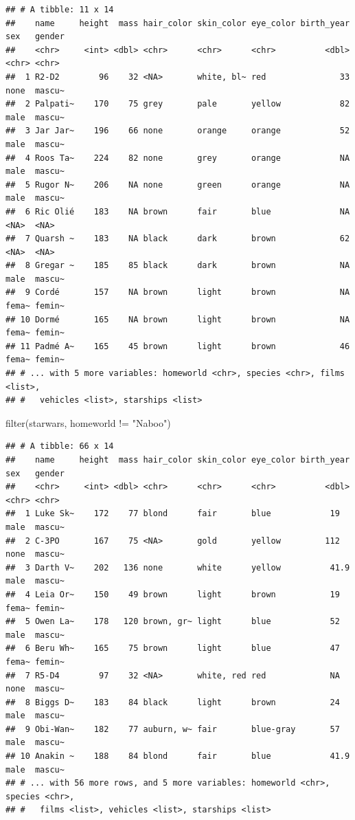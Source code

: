 \documentclass[]{tufte-handout}
\newenvironment{Shaded}{}{}
\newcommand{\FunctionTok}[1]{\textcolor[rgb]{0.02,0.16,0.49}{#1}}
\newcommand{\NormalTok}[1]{#1}
\newcommand{\SpecialCharTok}[1]{\textcolor[rgb]{0.25,0.44,0.63}{#1}}
\newcommand{\StringTok}[1]{\textcolor[rgb]{0.25,0.44,0.63}{#1}}
\begin{document}
\begin{verbatim}
## # A tibble: 11 x 14
##    name     height  mass hair_color skin_color eye_color birth_year sex   gender
##    <chr>     <int> <dbl> <chr>      <chr>      <chr>          <dbl> <chr> <chr> 
##  1 R2-D2        96    32 <NA>       white, bl~ red               33 none  mascu~
##  2 Palpati~    170    75 grey       pale       yellow            82 male  mascu~
##  3 Jar Jar~    196    66 none       orange     orange            52 male  mascu~
##  4 Roos Ta~    224    82 none       grey       orange            NA male  mascu~
##  5 Rugor N~    206    NA none       green      orange            NA male  mascu~
##  6 Ric Olié    183    NA brown      fair       blue              NA <NA>  <NA>  
##  7 Quarsh ~    183    NA black      dark       brown             62 <NA>  <NA>  
##  8 Gregar ~    185    85 black      dark       brown             NA male  mascu~
##  9 Cordé       157    NA brown      light      brown             NA fema~ femin~
## 10 Dormé       165    NA brown      light      brown             NA fema~ femin~
## 11 Padmé A~    165    45 brown      light      brown             46 fema~ femin~
## # ... with 5 more variables: homeworld <chr>, species <chr>, films <list>,
## #   vehicles <list>, starships <list>
\end{verbatim}

\begin{Shaded}
\begin{Highlighting}[]
\FunctionTok{filter}\NormalTok{(starwars, homeworld }\SpecialCharTok{!=} \StringTok{"Naboo"}\NormalTok{)}
\end{Highlighting}
\end{Shaded}

\begin{verbatim}
## # A tibble: 66 x 14
##    name     height  mass hair_color skin_color eye_color birth_year sex   gender
##    <chr>     <int> <dbl> <chr>      <chr>      <chr>          <dbl> <chr> <chr> 
##  1 Luke Sk~    172    77 blond      fair       blue            19   male  mascu~
##  2 C-3PO       167    75 <NA>       gold       yellow         112   none  mascu~
##  3 Darth V~    202   136 none       white      yellow          41.9 male  mascu~
##  4 Leia Or~    150    49 brown      light      brown           19   fema~ femin~
##  5 Owen La~    178   120 brown, gr~ light      blue            52   male  mascu~
##  6 Beru Wh~    165    75 brown      light      blue            47   fema~ femin~
##  7 R5-D4        97    32 <NA>       white, red red             NA   none  mascu~
##  8 Biggs D~    183    84 black      light      brown           24   male  mascu~
##  9 Obi-Wan~    182    77 auburn, w~ fair       blue-gray       57   male  mascu~
## 10 Anakin ~    188    84 blond      fair       blue            41.9 male  mascu~
## # ... with 56 more rows, and 5 more variables: homeworld <chr>, species <chr>,
## #   films <list>, vehicles <list>, starships <list>
\end{verbatim}
\end{document}
